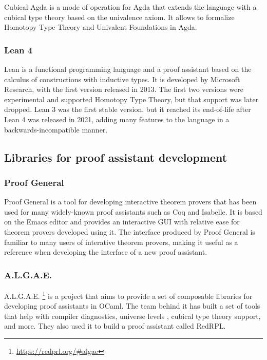 Cubical Agda \cite{VEZZOSI2021} is a mode of operation for Agda that extends the language with a cubical type theory \cite{Cohen2016} based on the univalence axiom.
It allows to formalize Homotopy Type Theory and Univalent Foundations in Agda.

\subsubsection{Lean 4}

Lean is a functional programming language and a proof assistant based on the calculus of constructions with inductive types.
It is developed by Microsoft Research, with the first version released in 2013.
The first two versions were experimental and supported Homotopy Type Theory, but that support was later dropped.
Lean 3 was the first stable version, but it reached its end-of-life after Lean 4 was released in 2021, adding many features to the language in a backwards-incompatible manner.

\subsection{Libraries for proof assistant development}

\subsubsection{Proof General}

Proof General \cite{Aspinall2000} is a tool for developing interactive theorem
provers that has been used for many widely-known proof assistants such as Coq
and Isabelle.
It is based on the Emacs editor and provides an interactive GUI with relative
ease for theorem provers developed using it.
The interface produced by Proof General is familiar to many users of interative theorem
provers, making it useful as a reference when developing the interface of a new proof assistant.

\subsubsection{A.L.G.A.E.}

A.L.G.A.E. \footnote{\url{https://redprl.org/\#algae}} is a project that aims to provide a set
of composable libraries for developing proof assistants in OCaml.
The team behind it has built a set of tools that help with compiler diagnostics,
universe levels \cite{HouFavonia2023}, cubical type theory support, and more.
They also used it to build a proof assistant called RedRPL.

